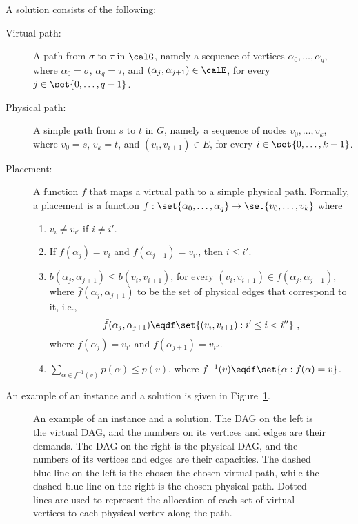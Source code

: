 A solution consists of the following:
\begin{description}
\item[Virtual path:] A path from $\sigma$ to $\tau$ in $\calG$, namely
  a sequence of vertices $\alpha_0,\ldots,\alpha_q$, where
  $\alpha_0 = \sigma$, $\alpha_q = \tau$, and
  $(\alpha_j,\alpha_{j+1}) \in \calE$, for every $j \in
  \set{0,\ldots,q-1}$.

\medskip
  
\item[Physical path:] A simple path from $s$ to $t$ in $G$, namely a
  sequence of nodes $v_0,\ldots,v_k$, where $v_0 = s$, $v_k = t$, and
  $(v_i,v_{i+1}) \in E$, for every $i \in \set{0,\ldots,k-1}$.

\medskip
  
\item[Placement:] A function $f$ that maps a virtual path to a simple
  physical path.  Formally, a placement is a function $f:
  \set{\alpha_0,\ldots,\alpha_q} \to \set{v_0,\ldots,v_k}$ where 
\begin{enumerate}
\item $v_i \neq v_{i'}$ if $i \neq i'$.    
\item If $f(\alpha_j) = v_i$ and $f(\alpha_{j+1}) = v_{i'}$, then $i
  \leq i'$.
\item $b(\alpha_j,\alpha_{j+1}) \leq b(v_i,v_{i+1})$, for every
  $(v_i,v_{i+1}) \in \bar{f}(\alpha_j,\alpha_{j+1})$, where
  $\bar{f}(\alpha_j,\alpha_{j+1})$ to be the set of physical edges
  that correspond to it, i.e.,
\[
\bar{f}(\alpha_j,\alpha_{j+1}) \eqdf \set{(v_i,v_{i+1}) : i' \leq i < i''}
~,
\]
  where $f(\alpha_j) = v_{i'}$ and $f(\alpha_{j+1}) = v_{i''}$.

\item $\sum_{\alpha \in f^{-1}(v)} p(\alpha) \leq p(v)$, where
  $f^{-1}(v) \eqdf \set{\alpha : f(\alpha) = v}$.
 
\end{enumerate}
\end{description}

An example of an \scp instance and a solution is given in
Figure~\ref{fig:solution}.

\begin{figure}[t]
\centering
{}
\caption[\scp{} - Example input and output]{An example of an \scp instance and a solution.
%
The DAG on the left is the virtual DAG, and the numbers on its
vertices and edges are their demands.
%
The DAG on the right is the physical DAG, and the numbers of its
vertices and edges are their capacities.
%
The dashed blue line on the left is the chosen the chosen virtual
path, while the dashed blue line on the right is the chosen physical
path.  Dotted lines are used to represent the allocation of each set
of virtual vertices to each physical vertex along the path.
%
}
\label{fig:solution}
\end{figure}

